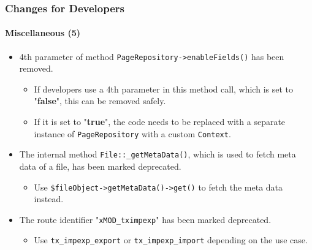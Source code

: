 \begin{frame}[fragile]
	\frametitle{Changes for Developers}
	\framesubtitle{Miscellaneous (5)}

	\begin{itemize}

		\item 4th parameter of method \texttt{PageRepository->enableFields()} has been removed.

		\begin{itemize}\smaller
			\item[\ding{228}] If developers use a 4th parameter in this method call, which is set to "\textbf{false}", this can be removed safely.
			\item[\ding{228}] If it is set to "\textbf{true}", the code needs to be replaced with a separate instance of \texttt{PageRepository} with a custom \texttt{Context}.
		\end{itemize}\normalsize

		\item The internal method \texttt{File::\_getMetaData()}, which is used to fetch meta data of a file,
			has been marked deprecated.

			\begin{itemize}\smaller
				\item[\ding{228}] Use \texttt{\$fileObject->getMetaData()->get()} to fetch the meta data instead.
			\end{itemize}\normalsize

		\item The route identifier "\texttt{xMOD\_tximpexp}" has been marked deprecated.

			\begin{itemize}\smaller
				\item[\ding{228}] Use \texttt{tx\_impexp\_export} or \texttt{tx\_impexp\_import} depending on the use case.
			\end{itemize}\normalsize

	\end{itemize}

\end{frame}


